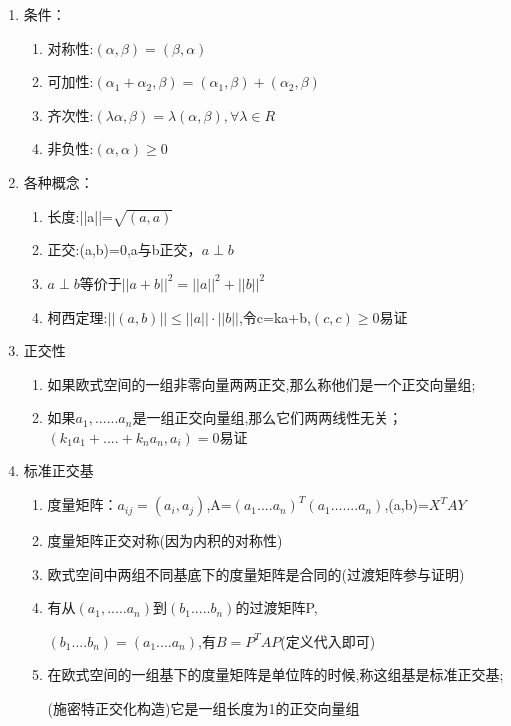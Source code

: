 \documentclass[11pt, a4paper, UTF8]{ctexart}
\begin{document}
\begin{solution}
  \begin{enumerate}
  \item 条件：
  \begin{enumerate}
    \item 对称性:$(\alpha , \beta)=(\beta,\alpha)$
    \item 可加性:$(\alpha _1+\alpha _2,\beta)=(\alpha _1,\beta)+(\alpha _2,\beta)$
    \item 齐次性:$(\lambda \alpha ,\beta)=\lambda (\alpha ,\beta),\forall \lambda \in R$
    \item 非负性:$(\alpha ,\alpha )\geq 0$
  \end{enumerate}
  \item 各种概念：
  \begin{enumerate}
    \item 长度:||a||=$\sqrt{(a,a)}$
    \item 正交:(a,b)=0,a与b正交，$a\perp b$
    \item $a\perp b$等价于$||a+b||^{2}=||a||^2+||b||^{2}$
    \item 柯西定理:$||(a,b)||\leq ||a||\cdot ||b||$,令c=ka+b,$(c,c)\geq 0$易证
  \end{enumerate}
  \item 正交性
  \begin{enumerate}
  \item 如果欧式空间的一组非零向量两两正交,那么称他们是一个正交向量组;
  \item 如果$a_1,......a_n$是一组正交向量组,那么它们两两线性无关；$(k_1a_1+....+k_na_n,a_i)=0$易证
  \end{enumerate}
  \item 标准正交基
  \begin{enumerate}
    \item 度量矩阵：$a_{ij}=(a_i,a_j)$,A=$(a_1....a_n)^{T}(a_1.......a_n)$,(a,b)=$X^{T}AY$
    \item 度量矩阵正交对称(因为内积的对称性)
    \item 欧式空间中两组不同基底下的度量矩阵是合同的(过渡矩阵参与证明)
    \item 有从$(a_1,.....a_n)到(b_1.....b_n)$的过渡矩阵P,
    
    $(b_1....b_n)=(a_1....a_n)$,有$B=P^{T}AP$(定义代入即可)
    \item 在欧式空间的一组基下的度量矩阵是单位阵的时候,称这组基是标准正交基;
    
    (施密特正交化构造)它是一组长度为1的正交向量组
    

\end{enumerate}
\end{enumerate}
\end{solution}
\end{document}
